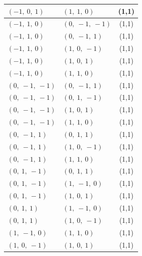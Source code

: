 \documentclass[11pt]{article}
\theoremstyle{definition}
\begin{document}
\begin{longtable}{|l|l|c|}
    \hline
    $\left( -1, \  0, \  1\right)$ & $\left( 1, \  1, \  0\right)$ & (1,1) \\
    \hline
    $\left( -1, \  1, \  0\right)$ & $\left( 0, \  -1, \  -1\right)$ & (1,1) \\
    \hline
    $\left( -1, \  1, \  0\right)$ & $\left( 0, \  -1, \  1\right)$ & (1,1) \\
    \hline
    $\left( -1, \  1, \  0\right)$ & $\left( 1, \  0, \  -1\right)$ & (1,1) \\
    \hline
    $\left( -1, \  1, \  0\right)$ & $\left( 1, \  0, \  1\right)$ & (1,1) \\
    \hline
    $\left( -1, \  1, \  0\right)$ & $\left( 1, \  1, \  0\right)$ & (1,1) \\
    \hline
    $\left( 0, \  -1, \  -1\right)$ & $\left( 0, \  -1, \  1\right)$ & (1,1) \\
    \hline
    $\left( 0, \  -1, \  -1\right)$ & $\left( 0, \  1, \  -1\right)$ & (1,1) \\
    \hline
    $\left( 0, \  -1, \  -1\right)$ & $\left( 1, \  0, \  1\right)$ & (1,1) \\
    \hline
    $\left( 0, \  -1, \  -1\right)$ & $\left( 1, \  1, \  0\right)$ & (1,1) \\
    \hline
    $\left( 0, \  -1, \  1\right)$ & $\left( 0, \  1, \  1\right)$ & (1,1) \\
    \hline
    $\left( 0, \  -1, \  1\right)$ & $\left( 1, \  0, \  -1\right)$ & (1,1) \\
    \hline
    $\left( 0, \  -1, \  1\right)$ & $\left( 1, \  1, \  0\right)$ & (1,1) \\
    \hline
    $\left( 0, \  1, \  -1\right)$ & $\left( 0, \  1, \  1\right)$ & (1,1) \\
    \hline
    $\left( 0, \  1, \  -1\right)$ & $\left( 1, \  -1, \  0\right)$ & (1,1) \\
    \hline
    $\left( 0, \  1, \  -1\right)$ & $\left( 1, \  0, \  1\right)$ & (1,1) \\
    \hline
    $\left( 0, \  1, \  1\right)$ & $\left( 1, \  -1, \  0\right)$ & (1,1) \\
    \hline
    $\left( 0, \  1, \  1\right)$ & $\left( 1, \  0, \  -1\right)$ & (1,1) \\
    \hline
    $\left( 1, \  -1, \  0\right)$ & $\left( 1, \  1, \  0\right)$ & (1,1) \\
    \hline
    $\left( 1, \  0, \  -1\right)$ & $\left( 1, \  0, \  1\right)$ & (1,1) \\
    \hline

\end{longtable}
\end{document}
